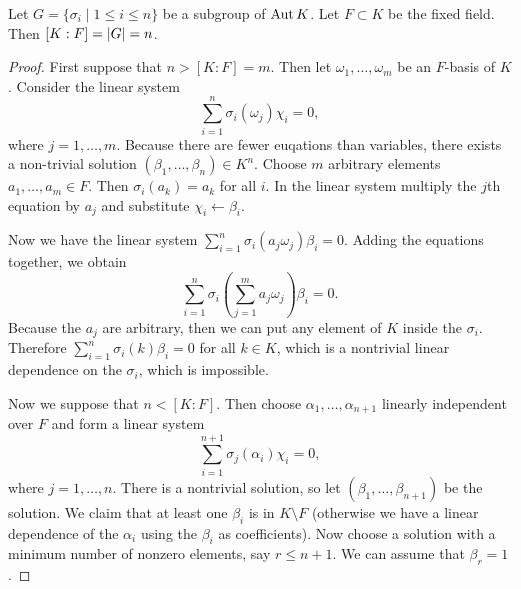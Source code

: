 \documentclass[10pt, twoside]{article}
\begin{document}
    \begin{thm} Let $G = \{\sigma_i \mid 1 \leq i \leq n\}$ be a subgroup of
        $\operatorname{Aut}{K}$. Let $F \subset K$ be the fixed field. Then $[K:F] = \lvert G\rvert
        = n$.  \begin{proof} First suppose that $n > [K:F] = m$. Then let
            $\omega_1, \ldots, \omega_m$ be an $F$-basis of $K$. Consider the
            linear system \[\sum_{i=1}^n \sigma_i(\omega_j) \chi_i = 0,\] where
            $j = 1, \ldots, m$. Because there are fewer euqations than
            variables, there exists a non-trivial solution $(\beta_1, \ldots,
            \beta_n) \in K^n$. Choose $m$ arbitrary elements $a_1, \ldots, a_m
            \in F$. Then $\sigma_i(a_k) = a_k$ for all $i$. In the linear
            system multiply the $j$th equation by $a_j$ and substitute $\chi_i
            \gets \beta_i$.

            Now we have the linear system $\sum_{i=1}^n \sigma_i(a_j \omega_j)
            \beta_i = 0$. Adding the equations together, we obtain
            \[\sum_{i=1}^n \sigma_i \left(\sum_{j=1}^m a_j \omega_j \right)
            \beta_i = 0.\] Because the $a_j$ are arbitrary, then we can put any
            element of $K$ inside the $\sigma_i$. Therefore $\sum_{i=1}^n
            \sigma_i(k) \beta_i = 0$ for all $k \in K$, which is a nontrivial
            linear dependence on the $\sigma_i$, which is impossible.

            Now we suppose that $n < [K:F]$. Then choose $\alpha_1, \ldots,
            \alpha_{n+1}$ linearly independent over $F$ and form a linear
            system \[\sum_{i=1}^{n+1} \sigma_j(\alpha_i) \chi_i = 0,\] where $j
            = 1, \ldots, n$. There is a nontrivial solution, so let $(\beta_1,
            \ldots, \beta_{n+1})$ be the solution. We claim that at least one
            $\beta_i$ is in $K\setminus F$ (otherwise we have a linear
            dependence of the $\alpha_i$ using the $\beta_i$ as coefficients).
            Now choose a solution with a minimum number of nonzero elements,
            say $r \leq n+1$. We can assume that $\beta_r = 1$.


\end{proof}
\end{thm}
\end{document}

